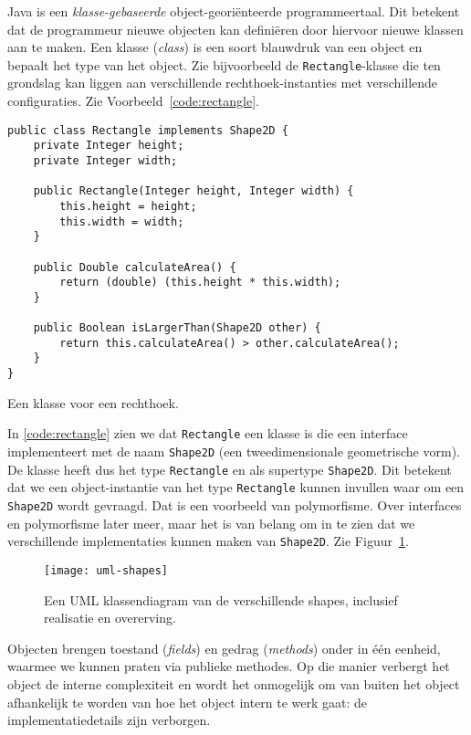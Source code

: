 \documentclass[dutch,a4paper,12pt,doubleside]{book}
\begin{document}
Java is een \emph{klasse-gebaseerde} object-georiënteerde programmeertaal.
Dit betekent dat de programmeur nieuwe objecten kan definiëren door hiervoor 
nieuwe klassen aan te maken. Een klasse (\textit{class}) is een soort 
blauwdruk van een object en bepaalt het type van het object.
Zie bijvoorbeeld de \texttt{Rectangle}-klasse die ten grondslag kan 
liggen aan verschillende rechthoek-instanties met verschillende configuraties.
Zie Voorbeeld~\ref{code:rectangle}.

\begin{listing}[H]
\begin{verbatim}
public class Rectangle implements Shape2D {
    private Integer height;
    private Integer width;

    public Rectangle(Integer height, Integer width) {
        this.height = height;
        this.width = width;
    }

    public Double calculateArea() {
        return (double) (this.height * this.width);
    }

    public Boolean isLargerThan(Shape2D other) {
        return this.calculateArea() > other.calculateArea();
    }
}
\end{verbatim}
\caption{Een klasse voor een rechthoek.}
\label{code:rectangle}
\end{listing}

In \ref{code:rectangle} zien we dat \texttt{Rectangle} een klasse is
die een interface implementeert met de naam \texttt{Shape2D} 
(een tweedimensionale geometrische vorm). De klasse heeft 
dus het type \texttt{Rectangle} en als supertype \texttt{Shape2D}. Dit betekent 
dat we een object-instantie van het type \texttt{Rectangle} kunnen invullen 
waar om een \texttt{Shape2D} wordt gevraagd. Dat is een voorbeeld van polymorfisme.
Over interfaces en polymorfisme later meer, maar het is van belang om in te zien dat 
we verschillende implementaties kunnen maken van \texttt{Shape2D}. Zie Figuur~\ref{fig:uml-shapes}.

\begin{figure}[H]
    \centering
    \texttt{[image: uml-shapes]}
    \caption{Een UML klassendiagram van de verschillende shapes, inclusief realisatie en overerving.}
    \label{fig:uml-shapes}
\end{figure}

Objecten brengen toestand (\textit{fields}) en gedrag (\textit{methods}) onder 
in één eenheid, waarmee we kunnen praten via publieke methodes. 
Op die manier verbergt het object de interne complexiteit en wordt het onmogelijk
om van buiten het object afhankelijk te worden van hoe het object intern te werk gaat:
de implementatiedetails zijn verborgen.
\end{document}
